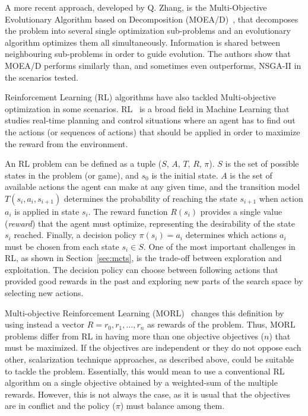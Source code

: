\documentclass[journal]{IEEEtran}
\begin{document}
A more recent approach, developed by Q. Zhang, is the Multi-Objective Evolutionary Algorithm based on Decomposition (MOEA/D)~\cite{Zhang2007}, that decomposes the problem into several single optimization sub-problems and an evolutionary algorithm optimizes them all simultaneously. Information is shared between neighbouring sub-problems in order to guide evolution. The authors show that MOEA/D performs similarly than, and sometimes even outperforms, NSGA-II in the scenarios tested.

Reinforcement Learning (RL) algorithms have also tackled Multi-objective optimization in some scenarios. RL~\cite{Sutton1998} is a broad field in Machine Learning that studies real-time planning and control situations where  an agent has to find out the actions (or sequences of actions) that should be applied in order to maximize the reward from the environment. 

An RL problem can be defined as a tuple ($S$, $A$, $T$, $R$, $\pi$). $S$ is the set of possible states in the problem (or game), and $s_0$ is the initial state. $A$ is the set of available actions the agent can make at any given time, and the transition model $T(s_i, a_i, s_{i+1})$ determines the probability of reaching the state $s_{i+1}$ when action $a_i$ is applied in state $s_i$. The reward function $R(s_i)$ provides a single value (\textit{reward}) that the agent must optimize, representing the desirability of the state $s_i$ reached. Finally, a decision policy $\pi(s_i) = a_i$ determines which actions $a_i$ must be chosen from each state $s_i \in S$. One of the most important challenges in RL, as shown in Section~\ref{sec:mcts}, is the trade-off between exploration and exploitation. The decision policy can choose between following actions that provided good rewards in the past and exploring new parts of the search space by selecting new actions. 

Multi-objective Reinforcement Learning (MORL)~\cite{Vamplew2010} changes this definition by using instead a vector $R = {r_0, r_1, \dots, r_n}$ as rewards of the problem. Thus, MORL problems differ from RL in having more than one objective objectives ($n$) that must be maximized. If the objectives are independent or they do not oppose each other, scalarization technique approaches, as described above, could be suitable to tackle the problem. Essentially, this would mean to use a conventional RL algorithm on a single objective obtained by a weighted-sum of the multiple rewards. However, this is not always the case, as it is usual that the objectives are in conflict and the policy ($\pi$) must balance among them.
\end{document}
